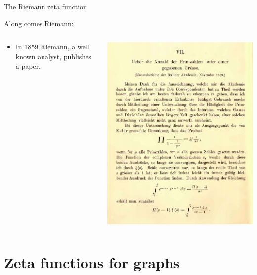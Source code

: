 \documentclass{beamer}
\begin{document}
\begin{frame}{The Riemann zeta function}
\begin{block}{Along comes Riemann:}
\begin{columns}
\begin{column}{.45\textwidth}
\begin{itemize}
\item In 1859 Riemann, a well known analyst, publishes a paper.
\end{itemize}
\end{column}
\begin{column}{.45\textwidth}
\includegraphics[width=\textwidth]{img/ueber}
\end{column}
\end{columns}
\end{block}
\end{frame}


\section{Zeta functions for graphs}
\end{document}
